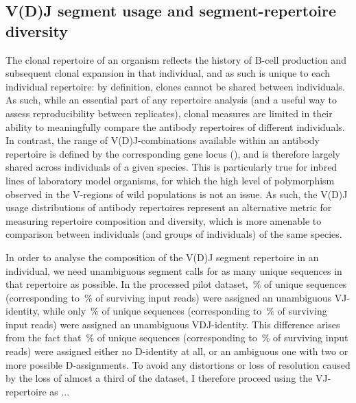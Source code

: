 \subsection{V(D)J segment usage and segment-repertoire diversity}
\label{sec:igseq_pilot_clones}

The clonal repertoire of an organism reflects the history of \naive B-cell production and subsequent clonal expansion in that individual, and as such is unique to each individual repertoire: by definition, clones cannot be shared between individuals. As such, while an essential part of any repertoire analysis (and a useful way to assess reproducibility between replicates), clonal measures are limited in their ability to meaningfully compare the antibody repertoires of different individuals. In contrast, the range of V(D)J-combinations available within an antibody repertoire is defined by the corresponding gene locus (), and is therefore largely shared across individuals of a given species. This is particularly true for inbred lines of laboratory model organisms, for which the high level of polymorphism observed in the V-regions of wild populations \parencite{gadalamaria2015tigger,corcoran2016igdiscover} is not an issue. As such, the V(D)J usage distributions of antibody repertoires represent an alternative metric for measuring repertoire composition and diversity, which is more amenable to comparison between individuals (and groups of individuals) of the same species.

In order to analyse the composition of the V(D)J segment repertoire in an individual, we need unambiguous segment calls for as many unique sequences in that repertoire as possible. In the processed pilot dataset, \,\% of unique sequences (corresponding to \,\% of surviving input reads) were assigned an unambiguous VJ-identity, while only \,\% of unique sequences (corresponding to \,\% of surviving input reads) were assigned an unambiguous VDJ-identity. This difference arises from the fact that \,\% of unique sequences (corresponding to \,\% of surviving input reads) were assigned either no D-identity at all, or an ambiguous one with two or more possible D-assignments. To avoid any distortions or loss of resolution caused by the loss of almost a third of the dataset, I therefore proceed using the VJ-repertoire as ... %

